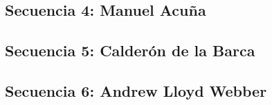    


\subsection[Secuencia 4]{Secuencia 4: Manuel Acuña}
\label{ssub:nocturno}

   


\subsection[Secuencia 5]{Secuencia 5: Calderón de la Barca}
\label{ssub:calderon}

   
  

\subsection[Secuencia 6]{Secuencia 6: Andrew Lloyd Webber}
\label{ssub:cats}

     

